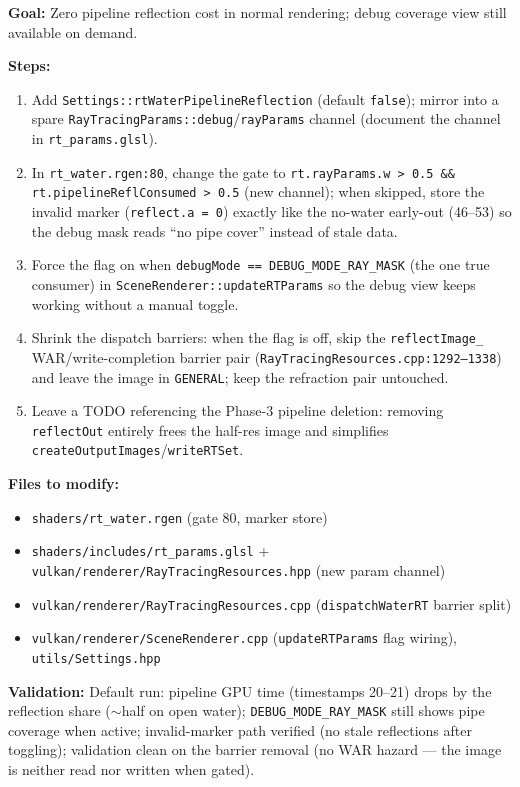 \documentclass[11pt,a4paper]{article}
\begin{document}
\begin{tcolorbox}[promptbox={Prompt: Gate the Pipeline Reflection Trace on Actual Consumption}]
\textbf{Goal:} Zero pipeline reflection cost in normal rendering; debug coverage view still available on demand.

\textbf{Steps:}
\begin{enumerate}
    \item Add \texttt{Settings::rtWaterPipelineReflection} (default \texttt{false}); mirror into a spare \texttt{RayTracingParams::debug}/\texttt{rayParams} channel (document the channel in \texttt{rt\_params.glsl}).
    \item In \texttt{rt\_water.rgen:80}, change the gate to \texttt{rt.rayParams.w > 0.5 \&\& rt.pipelineReflConsumed > 0.5} (new channel); when skipped, store the invalid marker (\texttt{reflect.a = 0}) exactly like the no-water early-out (46--53) so the debug mask reads ``no pipe cover'' instead of stale data.
    \item Force the flag on when \texttt{debugMode == DEBUG\_MODE\_RAY\_MASK} (the one true consumer) in \texttt{SceneRenderer::updateRTParams} so the debug view keeps working without a manual toggle.
    \item Shrink the dispatch barriers: when the flag is off, skip the \texttt{reflectImage\_} WAR/write-completion barrier pair (\texttt{RayTracingResources.cpp:1292--1338}) and leave the image in \texttt{GENERAL}; keep the refraction pair untouched.
    \item Leave a TODO referencing the Phase-3 pipeline deletion: removing \texttt{reflectOut} entirely frees the half-res image and simplifies \texttt{createOutputImages}/\texttt{writeRTSet}.
\end{enumerate}

\textbf{Files to modify:}
\begin{itemize}
    \item \texttt{shaders/rt\_water.rgen} (gate 80, marker store)
    \item \texttt{shaders/includes/rt\_params.glsl} + \texttt{vulkan/renderer/RayTracingResources.hpp} (new param channel)
    \item \texttt{vulkan/renderer/RayTracingResources.cpp} (\texttt{dispatchWaterRT} barrier split)
    \item \texttt{vulkan/renderer/SceneRenderer.cpp} (\texttt{updateRTParams} flag wiring), \texttt{utils/Settings.hpp}
\end{itemize}

\textbf{Validation:} Default run: pipeline GPU time (timestamps 20--21) drops by the reflection share ($\sim$half on open water); \texttt{DEBUG\_MODE\_RAY\_MASK} still shows pipe coverage when active; invalid-marker path verified (no stale reflections after toggling); validation clean on the barrier removal (no WAR hazard --- the image is neither read nor written when gated).
\end{tcolorbox}
\end{document}
